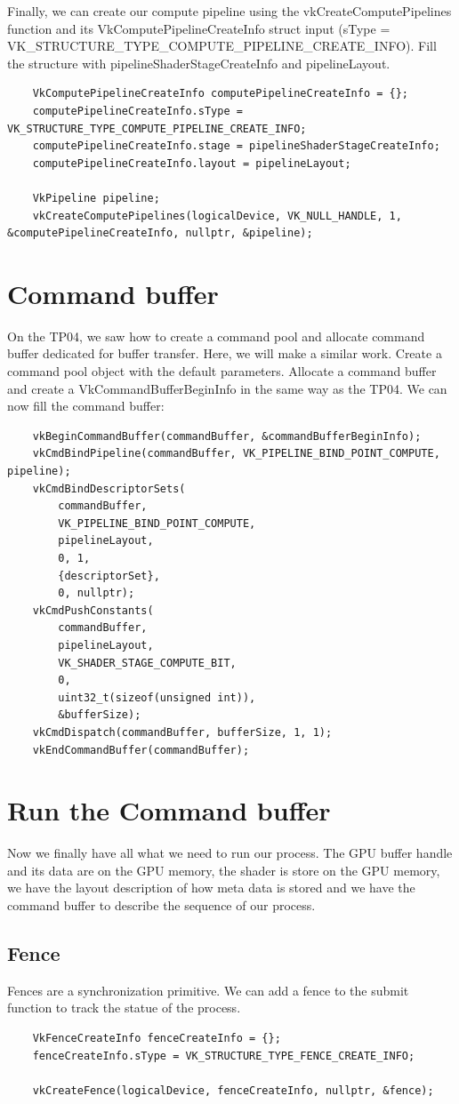 \documentclass{article}
\begin{document}
Finally, we can create our compute pipeline using the vkCreateComputePipelines function and its VkComputePipelineCreateInfo struct input (sType = VK\_STRUCTURE\_TYPE\_COMPUTE\_PIPELINE\_CREATE\_INFO). Fill the structure with pipelineShaderStageCreateInfo and pipelineLayout.
\begin{lstlisting}
	VkComputePipelineCreateInfo computePipelineCreateInfo = {};
	computePipelineCreateInfo.sType = VK_STRUCTURE_TYPE_COMPUTE_PIPELINE_CREATE_INFO;
	computePipelineCreateInfo.stage = pipelineShaderStageCreateInfo;
	computePipelineCreateInfo.layout = pipelineLayout;

	VkPipeline pipeline;
	vkCreateComputePipelines(logicalDevice, VK_NULL_HANDLE, 1, &computePipelineCreateInfo, nullptr, &pipeline);
\end{lstlisting}


\section{Command buffer}
On the TP04, we saw how to create a command pool and allocate command buffer dedicated for buffer transfer. Here, we will make a similar work. Create a command pool object with the default parameters. Allocate a command buffer and create a VkCommandBufferBeginInfo in the same way as the TP04. We can now fill the command buffer:
\begin{lstlisting}
	vkBeginCommandBuffer(commandBuffer, &commandBufferBeginInfo);
	vkCmdBindPipeline(commandBuffer, VK_PIPELINE_BIND_POINT_COMPUTE, pipeline);
	vkCmdBindDescriptorSets(
		commandBuffer,
		VK_PIPELINE_BIND_POINT_COMPUTE,
		pipelineLayout,
		0, 1,
		{descriptorSet},
		0, nullptr);
	vkCmdPushConstants(
		commandBuffer,
		pipelineLayout,
		VK_SHADER_STAGE_COMPUTE_BIT,
		0,
		uint32_t(sizeof(unsigned int)),
		&bufferSize);
	vkCmdDispatch(commandBuffer, bufferSize, 1, 1);
	vkEndCommandBuffer(commandBuffer);
\end{lstlisting}

\section{Run the Command buffer}
Now we finally have all what we need to run our process. The GPU buffer handle and its data are on the GPU memory, the shader is store on the GPU memory, we have the layout description of how meta data is stored and we have the command buffer to describe the sequence of our process.
\subsection{Fence}
Fences are a synchronization primitive. We can add a fence to the submit function to track the statue of the process.
\begin{lstlisting}
	VkFenceCreateInfo fenceCreateInfo = {};
	fenceCreateInfo.sType = VK_STRUCTURE_TYPE_FENCE_CREATE_INFO;

	vkCreateFence(logicalDevice, fenceCreateInfo, nullptr, &fence);
\end{lstlisting}
\end{document}
